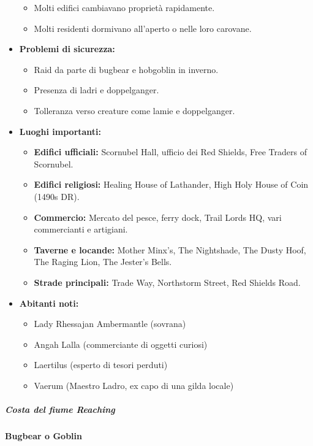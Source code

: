 \documentclass{article}
\begin{document}
\begin{itemize}
\begin{itemize}
        \item Molti edifici cambiavano proprietà rapidamente.
        \item Molti residenti dormivano all'aperto o nelle loro carovane.
    \end{itemize}
    \item \textbf{Problemi di sicurezza:} 
    \begin{itemize}
        \item Raid da parte di bugbear e hobgoblin in inverno.
        \item Presenza di ladri e doppelganger.
        \item Tolleranza verso creature come lamie e doppelganger.
    \end{itemize}
    \item \textbf{Luoghi importanti:} 
    \begin{itemize}
        \item \textbf{Edifici ufficiali:} Scornubel Hall, ufficio dei Red Shields, Free Traders of Scornubel.
        \item \textbf{Edifici religiosi:} Healing House of Lathander, High Holy House of Coin (1490s DR).
        \item \textbf{Commercio:} Mercato del pesce, ferry dock, Trail Lords HQ, vari commercianti e artigiani.
        \item \textbf{Taverne e locande:} Mother Minx's, The Nightshade, The Dusty Hoof, The Raging Lion, The Jester's Bells.
        \item \textbf{Strade principali:} Trade Way, Northstorm Street, Red Shields Road.
    \end{itemize}
    \item \textbf{Abitanti noti:} 
    \begin{itemize}
        \item Lady Rhessajan Ambermantle (sovrana)
        \item Angah Lalla (commerciante di oggetti curiosi)
        \item Laertilus (esperto di tesori perduti)
        \item Vaerum (Maestro Ladro, ex capo di una gilda locale)
    \end{itemize}
\end{itemize}


\subparagraph{Costa del fiume Reaching}
 \textbf{Bugbear o Goblin}
\end{document}

